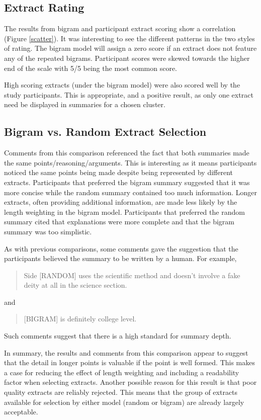     \tocless\subsection{Extract Rating}
      The results from bigram and participant extract scoring show a correlation (Figure \ref{scatter}). It was interesting to see the different patterns in the two styles of rating. The bigram model will assign a zero score if an extract does not feature any of the repeated bigrams. Participant scores were skewed towards the higher end of the scale with 5/5 being the most common score.

      High scoring extracts (under the bigram model) were also scored well by the study participants. This is appropriate, and a positive result, as only one extract need be displayed in summaries for a chosen cluster.

    \tocless\subsection{Bigram vs. Random Extract Selection}
      Comments from this comparison referenced the fact that both summaries made the same points/reasoning/arguments. This is interesting as it means participants noticed the same points being made despite being represented by different extracts. Participants that preferred the bigram summary suggested that it was more concise while the random summary contained too much information. Longer extracts, often providing additional information, are made less likely by the length weighting in the bigram model. Participants that preferred the random summary cited that explanations were more complete and that the bigram summary was too simplistic.

      As with previous comparisons, some comments gave the suggestion that the participants believed the summary to be written by a human. For example, \blockquote{Side [RANDOM] uses the scientific method and doesn't involve a fake deity at all in the science section.} and \blockquote{[BIGRAM] is definitely college level.}. Such comments suggest that there is a high standard for summary depth.

      In summary, the results and comments from this comparison appear to suggest that the detail in longer points is valuable if the point is well formed. This makes a case for reducing the effect of length weighting and including a readability factor when selecting extracts. Another possible reason for this result is that poor quality extracts are reliably rejected. This means that the group of extracts available for selection by either model (random or bigram) are already largely acceptable.

